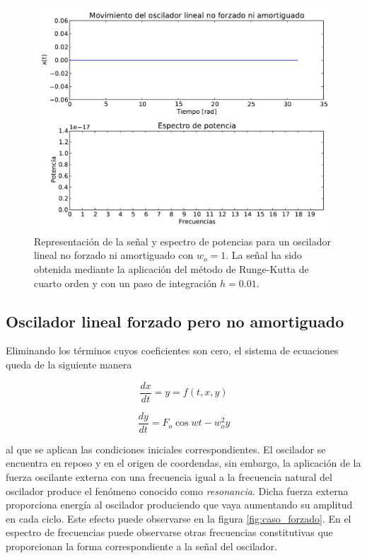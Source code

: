 \documentclass[11pt]{article}
\begin{document}
\begin{figure}[h]
\centering
\includegraphics[width=0.75\linewidth]{caso_lineal.pdf}
\caption{Representación de la señal y espectro de potencias para un oscilador lineal no forzado ni amortiguado con $w_o = 1$. La señal ha sido obtenida mediante la aplicación del método de Runge-Kutta de cuarto orden y con un paso de integración $h = 0.01$.}
\label{fig:caso_lineal}
\end{figure}

\subsection{Oscilador lineal forzado pero no amortiguado}
Eliminando los términos cuyos coeficientes son cero, el sistema de ecuaciones queda de la siguiente manera

\begin{equation}
	\frac{dx}{dt} = y = f(t, x, y)
\end{equation}

\begin{equation}
	\frac{dy}{dt} = F_o\cos{wt} - w_o^2 y 	
\end{equation}

al que se aplican las condiciones iniciales correspondientes. El oscilador se encuentra en reposo y en el origen de coordendas, sin embargo, la aplicación de la fuerza oscilante externa con una frecuencia igual a la frecuencia natural del oscilador produce el fenómeno conocido como \textit{resonancia}. Dicha fuerza externa proporciona energía al oscilador produciendo que vaya aumentando su amplitud en cada ciclo. Este efecto puede observarse en la figura \ref{fig:caso_forzado}. En el espectro de frecuencias puede observarse otras frecuencias constitutivas que proporcionan la forma correspondiente a la señal del oscilador.
\end{document}
